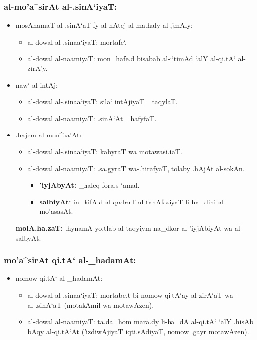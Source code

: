 \subsubsection{al-mo'a^sirAt al-.sinA`iyaT:}

\begin{itemize}
    \item mosAhamaT al-.sinA`aT fy al-nAtej al-ma.haly al-ijmAly:
    \begin{itemize}
        \item al-dowal al-.sinaa`iyaT: mortafe`.
        \item al-dowal al-naamiyaT: mon_hafe.d bisabab al-i`timAd `alY al-qi.tA` al-zirA`y.
    \end{itemize}
    
    \item naw` al-intAj:
    \begin{itemize}
        \item al-dowal al-.sinaa`iyaT: sila` intAjiyaT _taqylaT.
        \item al-dowal al-naamiyaT: .sinA`At _hafyfaT.
    \end{itemize}
    
    \item .hajem al-mon^sa'At:
    \begin{itemize}
        \item al-dowal al-.sinaa`iyaT: kabyraT wa motawasi.taT.
        \item al-dowal al-naamiyaT: .sa.gyraT wa-.hirafyaT, tolaby .hAjAt al-sokAn.
        \begin{itemize}
            \item\textbf{'iyjAbyAt:} _haleq fora.s `amal.
            \item\textbf{salbiyAt:} in_hifA.d al-qodraT al-tanAfosiyaT li-ha_dihi al-mo'asasAt.
        \end{itemize}
    \end{itemize}
    \textbf{molA.ha.zaT:} .hynamA yo.tlab al-taqyiym na_dkor al-'iyjAbiyAt wa-al-salbyAt.
\end{itemize}

\subsubsection{mo'a^sirAt qi.tA` al-_hadamAt:}

\begin{itemize}
    \item nomow qi.tA` al-_hadamAt:
    \begin{itemize}
        \item al-dowal al-.sinaa`iyaT: mortabe.t bi-nomow qi.tA`ay al-zirA`aT wa-al-.sinA`aT (motakAmil wa-motawAzen).
        \item al-dowal al-naamiyaT: ta.da_hom mara.dy li-ha_dA al-qi.tA` `alY .hisAb bAqy al-qi.tA`At ('izdiwAjiyaT iqti.sAdiyaT, nomow .gayr motawAzen).
    \end{itemize}
\end{itemize}